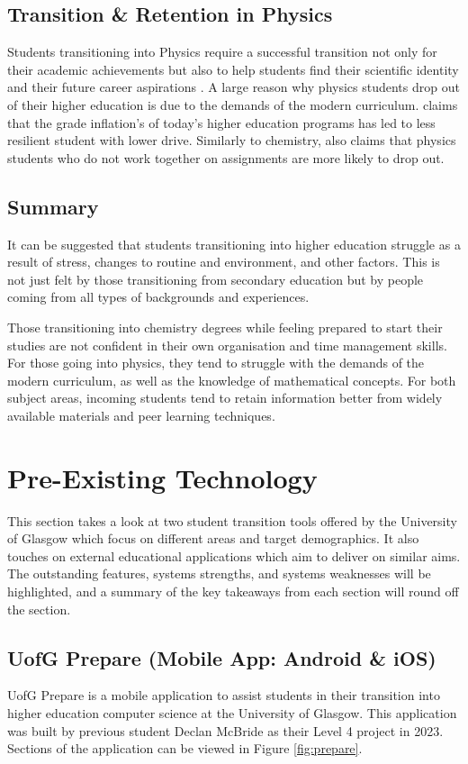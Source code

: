 \documentclass{l4proj}
\begin{document}
\subsection{Transition \& Retention in Physics}
Students transitioning into Physics require a successful transition not only for their academic achievements but also to help students find their scientific identity and their future career aspirations \citep{mcloughlin2024supporting}. A large reason why physics students drop out of their higher education is due to the demands of the modern curriculum. \citet{slavin2008factors} claims that the grade inflation's of today's higher education programs has led to less resilient student with lower drive. Similarly to chemistry,  \citet{slavin2008factors} also claims that physics students who do not work together on assignments are more likely to drop out.

\subsection{Summary}
It can be suggested that students transitioning into higher education struggle as a result of stress,  changes to routine and environment,  and other factors. This is not just felt by those transitioning from secondary education but by people coming from all types of backgrounds and experiences.

Those transitioning into chemistry degrees while feeling prepared to start their studies are not confident in their own organisation and time management skills. For those going into physics,  they tend to struggle with the demands of the modern curriculum,  as well as the knowledge of mathematical concepts. For both subject areas,  incoming students tend to retain information better from widely available materials and peer learning techniques.

\section{Pre-Existing Technology}
This section takes a look at two student transition tools offered by the University of Glasgow which focus on different areas and target demographics. It also touches on external educational applications which aim to deliver on similar aims. The outstanding features,  systems strengths,  and systems weaknesses will be highlighted,  and a summary of the key takeaways from each section will round off the section.

\subsection{UofG Prepare (Mobile App: Android \& iOS)}
UofG Prepare is a mobile application to assist students in their transition into higher education computer science at the University of Glasgow. This application was built by previous student Declan McBride as their Level 4 project in 2023. Sections of the application can be viewed in Figure \ref{fig:prepare}.
\end{document}

